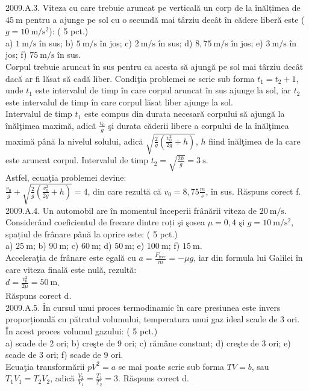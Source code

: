 2009.A.3. Viteza cu care trebuie aruncat pe verticală un corp de la înălțimea de $45 \mathrm{~m}$ pentru a ajunge pe sol cu o secundă mai târziu decât în cădere liberă este ($g=10 \mathrm{~m} / \mathrm{s}^{2}$): ( 5 pct.)\\ a) $1 \mathrm{~m} / \mathrm{s}$ în sus; b) $5 \mathrm{~m} / \mathrm{s}$ în jos; c) $2 \mathrm{~m} / \mathrm{s}$ în sus; d) $8,75 \mathrm{~m} / \mathrm{s}$ în jos; e) $3 \mathrm{~m} / \mathrm{s}$ în jos; f) $75 \mathrm{~m} / \mathrm{s}$ în sus.\\ Corpul trebuie aruncat în sus pentru ca acesta să ajungă pe sol mai târziu decât dacă ar fi lăsat să cadă liber. Condiţia problemei se scrie sub forma $t_{1}=t_{2}+1$, unde $t_{1}$ este intervalul de timp în care corpul aruncat în sus ajunge la sol, iar $t_{2}$ este intervalul de timp în care corpul lăsat liber ajunge la sol.\\ Intervalul de timp $t_{1}$ este compus din durata necesară corpului să ajungă la înălţimea maximă, adică $\frac{v_{0}}{g}$ şi durata căderii libere a corpului de la înălţimea maximă până la nivelul solului, adică $\sqrt{\frac{2}{g}\left(\frac{v_{0}^{2}}{2 g}+h\right)}$, $h$ fiind înălţimea de la care este aruncat corpul. Intervalul de timp $t_{2}=\sqrt{\frac{2 h}{g}}=3 \mathrm{~s}$.\\ Astfel, ecuaţia problemei devine:\\ $\frac{v_{0}}{g}+\sqrt{\frac{2}{g}\left(\frac{v_{0}^{2}}{2 g}+h\right)}=4$, din care rezultă că $v_{0}=8,75 \frac{m}{s}$, în sus. Răspuns corect f.\\

2009.A.4. Un automobil are în momentul începerii frânării viteza de $20 \mathrm{~m} / \mathrm{s}$. Considerând coeficientul de frecare dintre roți şi şosea $\mu=0,4$ şi $g=10 \mathrm{~m} / \mathrm{s}^{2}$, spațiul de frânare până la oprire este: ( 5 pct.)\\ a) $25 \mathrm{~m}$; b) $90 \mathrm{~m}$; c) $60 \mathrm{~m}$; d) $50 \mathrm{~m}$; e) $100 \mathrm{~m}$; f) $15 \mathrm{~m}$.\\ Acceleraţia de frânare este egală cu $a=\frac{F_{\text {frec}}}{m}=-\mu g$, iar din formula lui Galilei în care viteza finală este nulă, rezultă:\\ $d=\frac{v_{0}^{2}}{2 \mu}=50 \mathrm{~m}$.\\ Răspuns corect d.\\

2009.A.5. În cursul unui proces termodinamic în care presiunea este invers proporțională cu pătratul volumului, temperatura unui gaz ideal scade de 3 ori. În acest proces volumul gazului: ( 5 pct.)\\ a) scade de 2 ori; b) creşte de 9 ori; c) rămâne constant; d) creşte de 3 ori; e) scade de 3 ori; f) scade de 9 ori.\\ Ecuaţia transformării $p V^{2}=a$ se mai poate scrie sub forma $T V=b$, sau $T_{1} V_{1}=T_{2} V_{2}$, adică $\frac{V_{2}}{V_{1}}=\frac{T_{1}}{T_{2}}=3$. Răspuns corect d.\\


